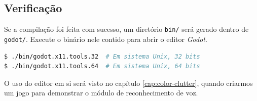
\subsection{Verificação}

Se a compilação foi feita com sucesso, um diretório \texttt{bin/} será gerado dentro de \texttt{godot/}. Execute o binário nele contido para abrir o editor \textit{Godot}.

\begin{lstlisting}[language=Bash]
$ ./bin/godot.x11.tools.32  # Em sistema Unix, 32 bits
$ ./bin/godot.x11.tools.64  # Em sistema Unix, 64 bits
\end{lstlisting}

O uso do editor em si será visto no capítulo \ref{cap:color-clutter}, quando criarmos um jogo para demonstrar o módulo de reconhecimento de voz.
